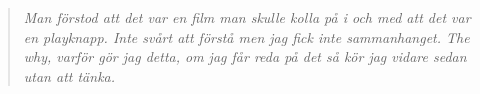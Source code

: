 \begin{quotation}
\em Man förstod att det var en film man skulle kolla på i och med att det var en playknapp. Inte svårt att förstå men jag fick inte sammanhanget. The why, varför gör jag detta, om jag får reda på det så kör jag vidare sedan utan att tänka.
\end{quotation}






